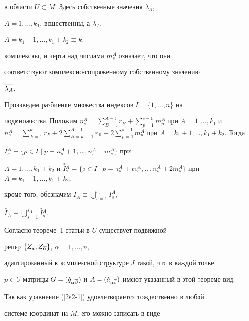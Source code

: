 в области $U \subset M$. Здесь собственные значения $\lambda_A$,


$A=1,\dotsc, k_1$, вещественны, а $\lambda_A$,


$A=k_1+1,\dotsc,k_1+k_2\equiv k$,


комплексны, и черта над числами $m^A_s$ означает, что они


соответствуют комплексно-сопряженному собственному значению


$\overline{\lambda_A}$.





Произведем разбиение множества индексов $I=\{1,\dotsc,n\}$ на


подмножества. Положим $n^A_s= \sum\limits_{B=1}^{A-1} r_B +


\sum\limits_{p=1}^{s-1} m_p^A$ при $A=1,\dotsc,k_1$ и $n_s^A =


\sum\limits_{B=1}^{k_1} r_B + 2\sum\limits_{B=k_1+1}^{A-1} r_B +


2\sum\limits_{p=1}^{s-1} m_p^A$ при $A=k_1 +1,\dotsc,k_1+k_2$. Тогда


$I_s^A = \{ p\in I \mid p=n^A_s+1,\dotsc,n^A_s+m^A_s\}$ при


$A=1,\dotsc,k_1+k_2$ и $\overset{*}{I}{}_s^A = \{ p\in I \mid


p=n^A_s+m^A_s,\dotsc,n^A_s+2m^A_s\}$ при $A=k_1+1,\dotsc,k_1+k_2$,


кроме того, обозначим $I_A \equiv \bigcup\limits^{s_A}_{s=1}I^A_s$,


$\overset{*}{I}{}_A \equiv \bigcup\limits^{s_A}_{s=1}\overset{*}{I}{}^A_s$.





Согласно теореме~1 статьи \cite{kanew} в $U$ существует подвижной


репер $\{Z_\alpha, Z_{\overline\alpha}\}$, $\alpha=1,\dotsc,n$,


адаптированный к комплексной структуре $J$ такой, что в каждой точке


$p\in U$ матрицы $G=(\Check g_{\alpha\ol\beta})$ и $A=(\Check


a_{\alpha\ol\beta})$ имеют указанный в этой теореме вид.





Так как уравнение (\ref{2s2-1}) удовлетворяется тождественно в любой


системе координат на $M$, его можно записать в виде


$$


